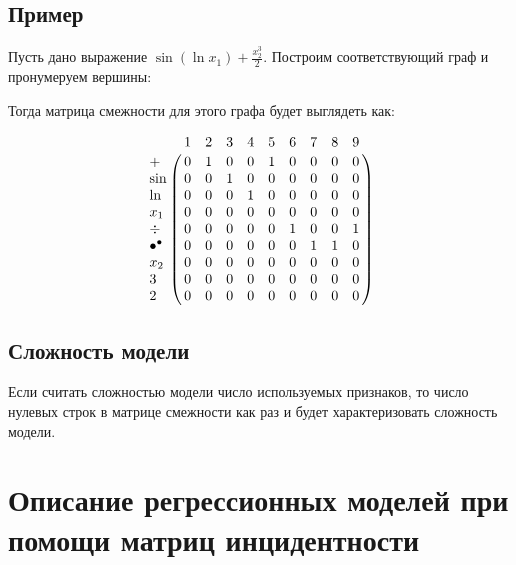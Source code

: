 \documentclass[12pt,a4paper]{amsart}
\begin{document}
\subsection{Пример}

Пусть дано выражение $ \sin (\ln x_1) + \frac{x_2^3}{2}$. Построим соответствующий граф и пронумеруем вершины:


Тогда матрица смежности для этого графа будет выглядеть как:

$$
\bordermatrix{
~ 	 			  & 1 & 2 & 3 & 4 & 5 & 6 & 7 & 8 & 9 \cr
+			      & 0 & 1 & 0 & 0 & 1 & 0 & 0 & 0 & 0 \cr
\sin 			  & 0 & 0 & 1 & 0 & 0 & 0 & 0 & 0 & 0 \cr
\ln				  & 0 & 0 & 0 & 1 & 0 & 0 & 0 & 0 & 0 \cr
x_1				  & 0 & 0 & 0 & 0 & 0 & 0 & 0 & 0 & 0 \cr
\div 			  & 0 & 0 & 0 & 0 & 0 & 1 & 0 & 0 & 1 \cr
\bullet^{\bullet} & 0 & 0 & 0 & 0 & 0 & 0 & 1 & 1 & 0 \cr
x_2				  & 0 & 0 & 0 & 0 & 0 & 0 & 0 & 0 & 0 \cr
3				  & 0 & 0 & 0 & 0 & 0 & 0 & 0 & 0 & 0 \cr
2				  & 0 & 0 & 0 & 0 & 0 & 0 & 0 & 0 & 0
}
$$

\subsection{Сложность модели}

Если считать сложностью модели число используемых признаков, то число нулевых строк в матрице смежности как раз и будет
характеризовать сложность модели.

\section{Описание регрессионных моделей при помощи матриц инцидентности}
\end{document}
